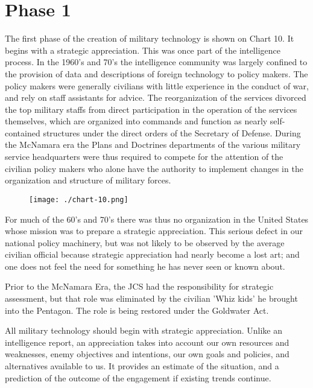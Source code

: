 \section{Phase 1}
The first phase of the creation of military technology is shown on Chart 10. It begins with a strategic appreciation. This was once part of the intelligence process. In the 1960's and 70's the intelligence community was largely confined to the provision of data and descriptions of foreign technology to policy makers. The policy makers were generally civilians with little experience in the conduct of war, and rely on staff assistants for advice. The reorganization of the services divorced the top military staffs from direct participation in the operation of the services themselves, which are organized into commands and function as nearly self-contained structures under the direct orders of the Secretary of Defense. During the McNamara era the Plans and Doctrines departments of the various military service headquarters were thus required to compete for the attention of the civilian policy makers who alone have the authority to implement changes in the organization and structure of military forces.

\begin{figure}[h!]
    \texttt{[image: ./chart-10.png]}
    \label{fig:chart-10}
\end{figure}

For much of the 60's and 70's there was thus no organization in the United States whose mission was to prepare a strategic appreciation. This serious defect in our national policy machinery, but was not likely to be observed by the average civilian official because strategic appreciation had nearly become a lost art; and one does not feel the need for something he has never seen or known about.

Prior to the McNamara Era, the JCS had the responsibility for strategic assessment, but that role was eliminated by the civilian 'Whiz kids' he brought into the Pentagon. The role is being restored under the Goldwater Act.

All military technology should begin with strategic appreciation. Unlike an intelligence report, an appreciation takes into account our own resources and weaknesses, enemy objectives and intentions, our own goals and policies, and alternatives available to us. It provides an estimate of the situation, and a prediction of the outcome of the engagement if existing trends continue.

